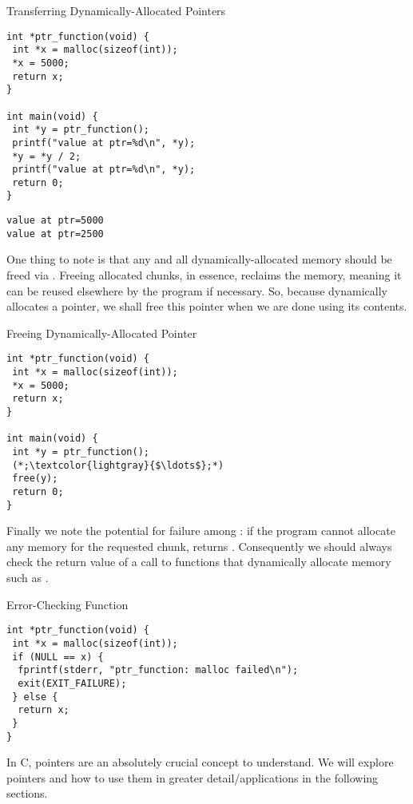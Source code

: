 \begin{cloast}[main.c]{Transferring Dynamically-Allocated Pointers}
\begin{lstlisting}[language=MyC]
int *ptr_function(void) {
 int *x = malloc(sizeof(int));
 *x = 5000;
 return x;
}

int main(void) {
 int *y = ptr_function();
 printf("value at ptr=%d\n", *y);
 *y = *y / 2;
 printf("value at ptr=%d\n", *y);
 return 0;
}
\end{lstlisting}
\tcblower
\begin{lstlisting}[language=MyOutput]
value at ptr=5000
value at ptr=2500
\end{lstlisting}
\end{cloast}

One thing to note is that any and all dynamically-allocated memory should be freed via . Freeing allocated chunks, in essence, reclaims the memory, meaning it can be reused elsewhere by the program if necessary. So, because  dynamically allocates a pointer, we shall free this pointer when we are done using its contents.

\begin{cl}[main.c]{Freeing Dynamically-Allocated Pointer}
\begin{lstlisting}[language=MyC]
int *ptr_function(void) {
 int *x = malloc(sizeof(int));
 *x = 5000;
 return x;
}

int main(void) {
 int *y = ptr_function();
 (*;\textcolor{lightgray}{$\ldots$};*)
 free(y);
 return 0;
}
\end{lstlisting}
\end{cl}

Finally we note the potential for failure among : if the program cannot allocate any memory for the requested chunk,  returns . Consequently we should always check the return value of a call to functions that dynamically allocate memory such as .

\begin{cl}[main.c]{Error-Checking  Function}
\begin{lstlisting}[language=MyC]
int *ptr_function(void) {
 int *x = malloc(sizeof(int));
 if (NULL == x) {
  fprintf(stderr, "ptr_function: malloc failed\n");
  exit(EXIT_FAILURE);
 } else {
  return x;
 }
}
\end{lstlisting}
\end{cl}

In C, pointers are an absolutely crucial concept to understand. We will explore pointers and how to use them in greater detail/applications in the following sections.

